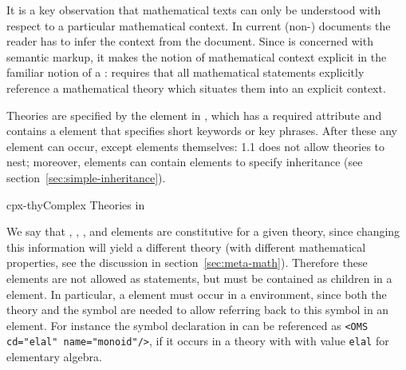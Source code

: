 It is a key observation that mathematical texts can only be understood with
respect to a particular mathematical context.  In current (non-{\omdoc}) documents
the reader has to infer the context from the document. Since {\omdoc} is concerned
with semantic markup, it makes the notion of mathematical context explicit in the
familiar notion of a {}:
{\omdoc} requires that all mathematical statements explicitly reference a
mathematical theory which situates them into an explicit context.

Theories are specified by the {} element in {\omdoc}, which has a
required {} attribute and contains a {}
element that specifies short keywords or key phrases. After these any
{} {\omdoc} element can occur, except {}
elements themselves: {\omdoc}1.1 does not allow theories to nest; moreover,
{} elements can contain {} elements to specify
inheritance (see section~\ref{sec:simple-inheritance}).

\begin{myfig}{cpx-thy}{Complex Theories in {\omdoc}}
  \quicktable{\complextable{}}
\end{myfig}
We say that {}, {}, {}, and
{} elements are constitutive for a given theory, since changing this
information will yield a different theory (with different mathematical properties,
see the discussion in section~\ref{sec:meta-math}). Therefore these
{} elements are not allowed as
{} statements, but must be contained as children in a
{} element. In particular, a {} element must occur
in a {} environment, since both the theory
{} and the symbol {} are needed to
allow referring back to this symbol in an {} element.  For instance
the symbol declaration in {} can be referenced as {\tt<OMS
  cd="elal" name="monoid"/>}, if it occurs in a theory with
{} with value {\tt{elal}} for elementary algebra.

